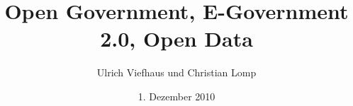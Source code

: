 \documentclass[compass]{beamer}
\title[Open Government, E-Government 2.0, Open Data \phantom{X} \insertframenumber/\inserttotalframenumber]{Open Government, E-Government 2.0, Open Data}
\author{Ulrich Viefhaus und Christian Lomp}
\institute{Seminar 1916 E-Government}
\date{1. Dezember 2010}
\begin{document}
\frame{\titlepage}




\end{document}
